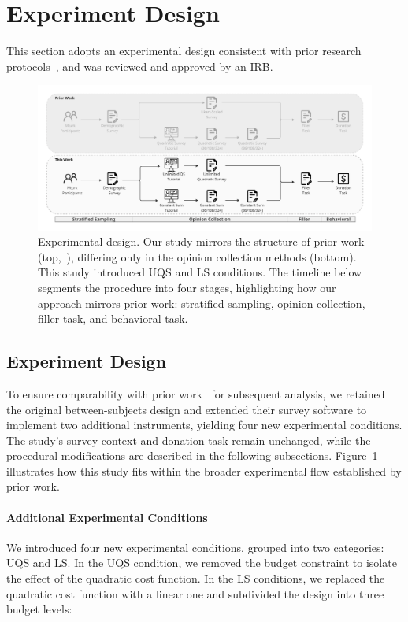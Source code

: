 \section{Experiment Design}
\label{sec:experiment}
This section adopts an experimental design consistent with prior research protocols~\cite{chengCanShowWhat2021}, and was reviewed and approved by an IRB.

\begin{figure}[t]
    \centering
    \includegraphics[width=\textwidth]{content/image/whyqs_exp_flow.pdf}
    \caption[]{Experimental design. Our study mirrors the structure of prior work (top,~\cite{chengCanShowWhat2021}), differing only in the opinion collection methods (bottom). This study introduced UQS and LS conditions. The timeline below segments the procedure into four stages, highlighting how our approach mirrors prior work: stratified sampling, opinion collection, filler task, and behavioral task.}
    \label{fig:experiment}
\end{figure}

\subsection{Experiment Design}
To ensure comparability with prior work~\cite{chengCanShowWhat2021} for subsequent analysis, we retained the original between-subjects design and extended their survey software to implement two additional instruments, yielding four new experimental conditions. The study's survey context and donation task remain unchanged, while the procedural modifications are described in the following subsections. Figure~\ref{fig:experiment} illustrates how this study fits within the broader experimental flow established by prior work.

\paragraph{Additional Experimental Conditions}
We introduced four new experimental conditions, grouped into two categories: UQS and LS. In the UQS condition, we removed the budget constraint to isolate the effect of the quadratic cost function. In the LS conditions, we replaced the quadratic cost function with a linear one and subdivided the design into three budget levels:

